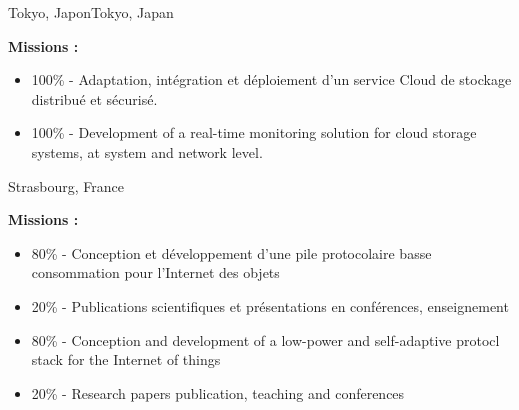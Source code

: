 \vspace{\ItemsSpacing}

{}{}{\ifnativelang Tokyo, Japon\else Tokyo, Japan\fi}{
\textbf{Missions :} 
\begin{itemize}
\ifnativelang
\item 100\% - Adaptation, int\'egration et d\'eploiement d'un service Cloud de stockage distribu\'e et s\'ecuris\'e.
\else
\item 100\% - Development of a real-time monitoring solution for cloud storage systems, at system and network level.
\fi
\end{itemize}
}

\vspace{\ItemsSpacing}

{}{}{Strasbourg, France}{
\textbf{Missions :} 
\begin{itemize}
\ifnativelang
\item 80\% - Conception et d\'eveloppement d'une pile protocolaire basse consommation pour l'Internet des objets
\item 20\% - Publications scientifiques et pr\'esentations en conf\'erences, enseignement
\else
\item 80\% - Conception and development of a low-power and self-adaptive protocl stack for the Internet of things
\item 20\% - Research papers publication, teaching and conferences
\fi
\end{itemize}
}


